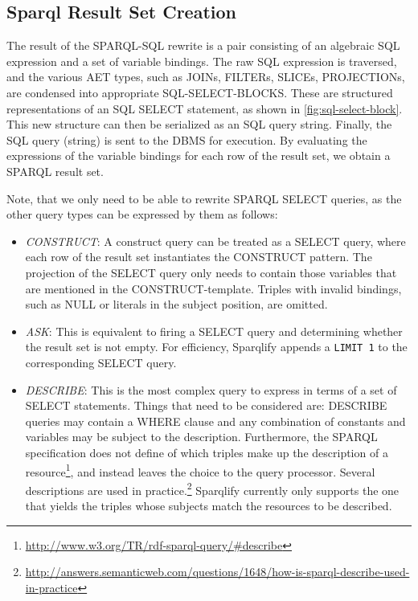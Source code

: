 \documentclass[a4paper,twoside,bibtotoc,abstracton,12pt,BCOR=15mm]{scrreprt}
\begin{document}
  



\subsection{Sparql Result Set Creation}
The result of the SPARQL-SQL rewrite is a pair consisting of an algebraic SQL expression and a set of variable bindings.
The raw SQL expression is traversed, and the various AET types, such as JOINs, FILTERs, SLICEs, PROJECTIONs, are
condensed into appropriate SQL-SELECT-BLOCKS. These are structured representations of an SQL SELECT statement, as shown in \autoref{fig:sql-select-block}.
This new structure can then be serialized as an SQL query string. Finally, the SQL query (string) is sent to the DBMS for execution.
By evaluating the expressions of the variable bindings for each row of the result set, we obtain a SPARQL result set.  

Note, that we only need to be able to rewrite SPARQL SELECT queries, as the other query types can be expressed by  them as follows:

\begin{itemize}
\item \emph{CONSTRUCT}: A construct query can be treated as a SELECT query, where each row of the result set instantiates the CONSTRUCT pattern.
	The projection of the SELECT query only needs to contain those variables that are mentioned in the CONSTRUCT-template.
	Triples with invalid bindings, such as NULL or literals in the subject position, are omitted.
\item \emph{ASK}: This is equivalent to firing a SELECT query and determining whether the result set is not empty. 
	For efficiency, Sparqlify appends a \texttt{LIMIT 1} to the corresponding SELECT query. 
\item \emph{DESCRIBE}: This is the most complex query to express in terms of a set of SELECT statements. 
	Things that need to be considered are: DESCRIBE queries may contain a WHERE clause and any combination of constants and variables may be subject to the description.
	Furthermore, the SPARQL specification does not define of which triples make up the description of a resource\footnote{\url{http://www.w3.org/TR/rdf-sparql-query/\#describe}},
	and instead leaves the choice to the query processor.
	Several descriptions are used in practice.\footnote{\url{http://answers.semanticweb.com/questions/1648/how-is-sparql-describe-used-in-practice}}
	Sparqlify currently only supports the one that yields the triples whose subjects match the resources to be described.    
\end{itemize}
\end{document}
